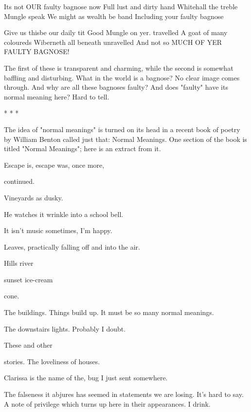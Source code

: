              Its not OUR faulty bagnose now
             Full lust and dirty hand
             Whitehall the treble Mungle speak
             We might as wealth be band
             Including your faulty bagnose

             Give us thisbe our daily tit
             Good Mungle on yer. travelled
             A goat of many coloureds
             Wiberneth all beneath unravelled
             And not so MUCH OF YER FAULTY BAGNOSE!





The first of these is transparent and charming, while the second is somewhat baffling and
disturbing. What in the world is a bagnose? No clear image comes through. And why are
all these bagnoses faulty? And does "faulty" have its normal meaning here? Hard to tell.

                                            *   *   *

The idea of "normal meanings" is turned on its head in a recent book of poetry by
William Benton called just that: Normal Meanings. One section of the book is titled
"Normal Meanings"; here is an extract from it.

Escape is, escape
       was, once more,

continued.

              Vineyards
       as dusky.


He watches it wrinkle into a school bell.

                It isn't music sometimes, I'm
       happy.


Leaves, practically falling
off and into the air.


                Hills river

       sunset ice-cream

                cone.


                        The buildings. Things
                               build up. It
                        must be so many
                               normal meanings.


The downstairs lights. Probably I doubt.





These and other

stories.
       The loveliness
of houses.

                        Clarissa is the name of the, bug I just sent somewhere.

The falseness it abjures has seemed in statements
                                we are losing.
                       It's hard to say. A note of privilege
which turns up here in their appearances.
                       I drink.

